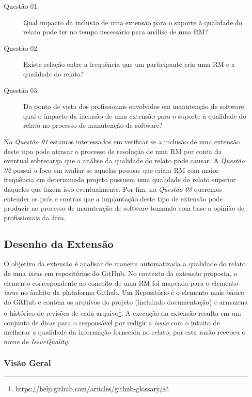 \begin{description}
	\item[Questão 01:] Qual impacto da inclusão de uma extensão para o suporte à
		qualidade do relato pode ter no tempo necessário para análise de uma
		RM\@?
	\item[Questão 02:] Existe relação entre a frequência que um participante
		cria uma RM e a qualidade do relato?
	\item[Questão 03:] Do ponto de vista dos profissionais envolvidos em
		manutenção de software qual o impacto da inclusão de uma extensão para o
		suporte à qualidade do relato no processo de manutenção de software?
\end{description}

Na \textit{Questão 01} estamos interessados em verificar se a inclusão de uma
extensão deste tipo pode atrasar o processo de resolução de uma RM por conta da
eventual sobrecarga que a análise da qualidade do relato pode causar. A
\textit{Questão 02} possui o foco em avaliar se aquelas pessoas que criam RM com
maior frequência em determinado projeto possuem uma qualidade do relato superior
daqueles que fazem isso eventualmente. Por fim, na \textit{Questão 03} queremos
entender os prós e contras que a implantação deste tipo de extensão pode
produzir no processo de manutenção de software tomando com base a opinião de
profissionais da área.

\subsection{Desenho da Extensão}
\label{sub:desenho_da_extensao}

O objetivo da extensão é analisar de maneira automatizada a qualidade do relato
de uma \textit{issue} em repositórios do GitHub. No contexto da extensão
proposta, o elemento correspondente ao conceito de uma RM foi mapeado para o
elemento \textit{issue} no âmbito da plataforma Github. Um Repositório é o
elemento mais básico do GitHub e contém os arquivos do projeto (incluindo
documentação) e armazena o histórico de revisões de cada
arquivo\footnote{\url{https://help.github.com/articles/github-glossary/}}. A
execução da extensão resulta em um conjunto de dicas para o responsável por
redigir a \textit{issue} com o intuito de melhorar a qualidade da informação
fornecida no relato, por esta razão recebeu o nome de \textit{IssueQuality}.

\subsubsection{Visão Geral}
\label{ssub:implementacao_extensao_visao_geral}

